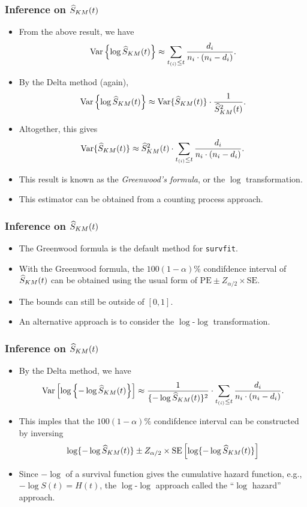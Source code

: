 \documentclass[10pt]{beamer}\usepackage[]{graphicx}\usepackage[]{color}
\newcommand{\empr}[1]{{\emph{\color{red}#1}}}
\newcommand{\Var}{\mathrm{Var}}
\newcommand{\SE}{\mathrm{SE}}
\newcommand{\Skm}{\widehat{S}_{\scriptsize{KM}}}
\begin{document}
\begin{frame}
  \frametitle{Inference on $\Skm(t)$}
  \begin{itemize}
  \item From the above result, we have
    $$\Var\left\{\log\Skm(t)\right\} \approx \sum_{t_{(i)}\le t}\frac{d_i}{n_i\cdot(n_i-d_i)}. $$
  \item By the Delta method (again), 
    $$\Var\left\{\log\Skm(t)\right\} \approx \Var\{\Skm(t)\} \cdot \frac{1}{\Skm^2(t)}.$$ 
  \item Altogether, this gives
    $$ \Var\{\Skm(t)\} \approx \Skm^2(t)\cdot\sum_{t_{(i)}\le t}\frac{d_i}{n_i\cdot(n_i-d_i)}.$$
  \item This result is known as the \empr{Greenwood's formula}, or the $\log$ transformation.
  \item This estimator can be obtained from a counting process approach.
  \end{itemize}
\end{frame}


\begin{frame}
  \frametitle{Inference on $\Skm(t)$}
  \begin{itemize}
  \item The Greenwood formula is the default method for \texttt{survfit}.
  \item With the Greenwood formula, the $100(1- \alpha)\%$ condifdence interval of $\Skm(t)$ can be obtained using the usual form of $\mbox{PE}\pm Z_{\alpha/2}\times\mbox{SE}$.
  \item The bounds can still be outside of $[0, 1]$.
  \item An alternative approach is to consider the $\log$-$\log$ transformation.
  \end{itemize}
\end{frame}


\begin{frame}
  \frametitle{Inference on $\Skm(t)$}
  \begin{itemize}
  \item By the Delta method, we have
    \begin{equation*}
      \Var\left[\log\left\{-\log \Skm(t)\right\}\right] \approx 
      \frac{1}{\{-\log\Skm(t)\}^2} \cdot\sum_{t_{(i)}\le t}\frac{d_i}{n_i\cdot(n_i-d_i)}.
    \end{equation*}
  \item This imples that the $100(1- \alpha)\%$ condifdence interval can be constructed by inversing 
    \begin{equation*}
      \log\{-\log\Skm(t)\} \pm Z_{\alpha/2} \times \SE\left[\log\{-\log\Skm(t)\}\right]
    \end{equation*}
  \item Since $-\log$ of a survival function gives the cumulative hazard function, e.g., $-\log S(t) = H(t)$, 
    the $\log$-$\log$ approach called the ``$\log$ hazard'' approach. 
  \end{itemize}
\end{frame}
\end{document}
